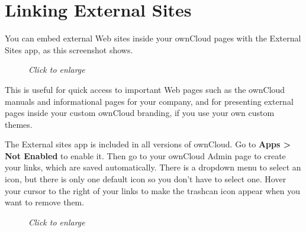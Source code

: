 \documentclass[letterpaper,10pt,english]{sphinxmanual}
\begin{document}
\section{Linking External Sites}
\label{configuration_server/external_sites::doc}\label{configuration_server/external_sites:linking-external-sites}
You can embed external Web sites inside your ownCloud pages with the External
Sites app, as this screenshot shows.
\begin{figure}[htbp]
\centering
\capstart

\caption{\emph{Click to enlarge}}\end{figure}

This is useful for quick access to important Web pages such as the
ownCloud manuals and informational pages for your company, and for presenting
external pages inside your custom ownCloud branding, if you use your own custom
themes.

The External sites app is included in all versions of ownCloud. Go to \textbf{Apps \textgreater{}
Not Enabled} to enable it. Then go to your ownCloud Admin page to create your
links, which are saved automatically. There is a dropdown menu to select an
icon, but there is only one default icon so you don't have to select one. Hover
your cursor to the right of your links to make the trashcan icon appear when you
want to remove them.
\begin{figure}[htbp]
\centering
\capstart

\caption{\emph{Click to enlarge}}\end{figure}
\end{document}
